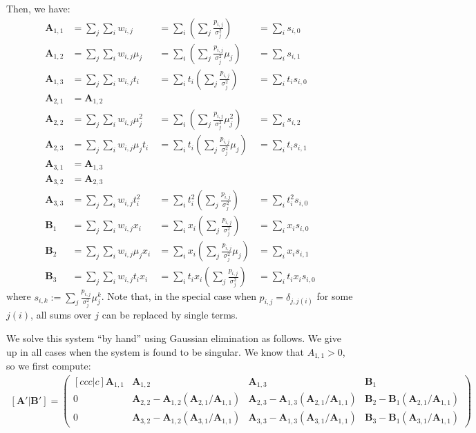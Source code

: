 \documentclass{article}
\begin{document}
Then, we have:
\begin{align*}
\bm{A}_{1,1} & = \sum_j \sum_i w_{i,j}
& = \sum_i \left( \sum_j \frac{p_{i,j}}{\sigma_j^2} \right)
& = \sum_i s_{i,0}
\\
\bm{A}_{1,2} & = \sum_j \sum_i w_{i,j} \mu_j
& = \sum_i \left( \sum_j \frac{p_{i,j}}{\sigma_j^2} \mu_j \right)
& = \sum_i s_{i,1}
\\
\bm{A}_{1,3} & = \sum_j \sum_i w_{i,j} t_i
& = \sum_i t_i \left( \sum_j \frac{p_{i,j}}{\sigma_j^2} \right)
& = \sum_i t_i s_{i,0}
\\
\bm{A}_{2,1} & = \bm{A}_{1,2}
\\
\bm{A}_{2,2} & = \sum_j \sum_i w_{i,j} \mu_j^2
& = \sum_i \left( \sum_j \frac{p_{i,j}}{\sigma_j^2} \mu_j^2 \right)
& = \sum_i s_{i,2}
\\
\bm{A}_{2,3} & = \sum_j \sum_i w_{i,j} \mu_j t_i
& = \sum_i t_i \left( \sum_j \frac{p_{i,j}}{\sigma_j^2} \mu_j \right)
& = \sum_i t_i s_{i,1}
\\
\bm{A}_{3,1} & = \bm{A}_{1,3}
\\
\bm{A}_{3,2} & = \bm{A}_{2,3}
\\
\bm{A}_{3,3} & = \sum_j \sum_i w_{i,j} t_i^2
& = \sum_i t_i^2 \left( \sum_j \frac{p_{i,j}}{\sigma_j^2} \right)
& = \sum_i t_i^2 s_{i,0}
\\
\bm{B}_1 & = \sum_j \sum_i w_{i,j} x_i
& = \sum_i x_i \left( \sum_j \frac{p_{i,j}}{\sigma_j^2} \right)
& = \sum_i x_i s_{i,0}
\\
\bm{B}_2 & = \sum_j \sum_i w_{i,j} \mu_j x_i
& = \sum_i x_i \left( \sum_j \frac{p_{i,j}}{\sigma_j^2} \mu_j \right)
& = \sum_i x_i s_{i,1}
\\
\bm{B}_3 & = \sum_j \sum_i w_{i,j} t_i x_i
& = \sum_i t_i x_i \left( \sum_j \frac{p_{i,j}}{\sigma_j^2} \right)
& = \sum_i t_i x_i s_{i,0}
\end{align*}
where $s_{i,k} := \sum_j \frac{p_{i,j}}{\sigma_j^2} \mu_j^k$. Note that, in the special case when $p_{i,j} = \delta_{j,j(i)}$ for some $j(i)$, all sums over $j$ can be replaced by single terms.

We solve this system ``by hand'' using Gaussian elimination as follows. We give up in all cases when the system is found to be singular. We know that $A_{1,1} > 0$, so we first compute:
\begin{align*}
\left[ \bm{A}' | \bm{B}' \right] =
\begin{pmatrix}[ccc|c]
\bm{A}_{1,1} &
\bm{A}_{1,2} &
\bm{A}_{1,3} &
\bm{B}_1
\\
0 &
\bm{A}_{2,2} - \bm{A}_{1,2} \left( \bm{A}_{2,1} / \bm{A}_{1,1} \right) &
\bm{A}_{2,3} - \bm{A}_{1,3} \left( \bm{A}_{2,1} / \bm{A}_{1,1} \right) &
\bm{B}_2 - \bm{B}_1 \left( \bm{A}_{2,1} / \bm{A}_{1,1} \right)
\\
0 &
\bm{A}_{3,2} - \bm{A}_{1,2} \left( \bm{A}_{3,1} / \bm{A}_{1,1} \right) &
\bm{A}_{3,3} - \bm{A}_{1,3} \left( \bm{A}_{3,1} / \bm{A}_{1,1} \right) &
\bm{B}_3 - \bm{B}_1 \left( \bm{A}_{3,1} / \bm{A}_{1,1} \right)
\end{pmatrix}
\end{align*}
\end{document}
